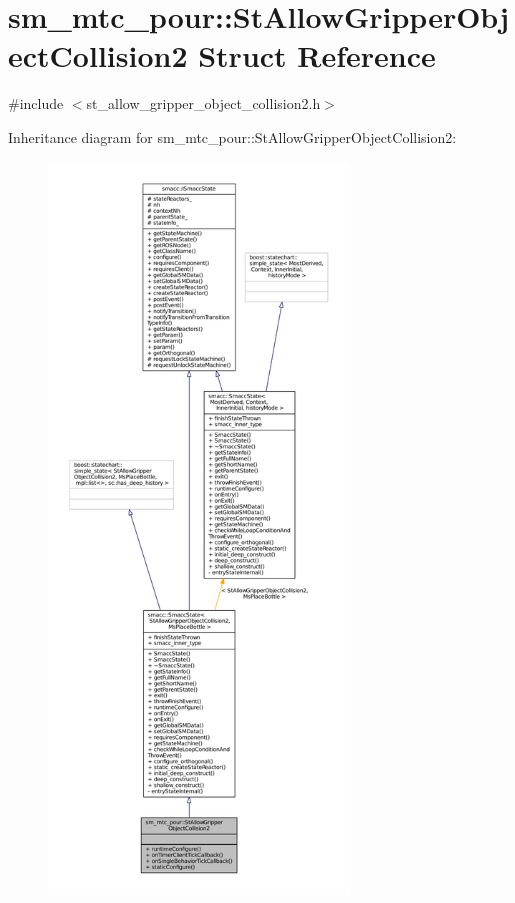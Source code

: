 \hypertarget{structsm__mtc__pour_1_1StAllowGripperObjectCollision2}{}\section{sm\+\_\+mtc\+\_\+pour\+:\+:St\+Allow\+Gripper\+Object\+Collision2 Struct Reference}
\label{structsm__mtc__pour_1_1StAllowGripperObjectCollision2}


{\ttfamily \#include $<$st\+\_\+allow\+\_\+gripper\+\_\+object\+\_\+collision2.\+h$>$}



Inheritance diagram for sm\+\_\+mtc\+\_\+pour\+:\+:St\+Allow\+Gripper\+Object\+Collision2\+:
\nopagebreak
\begin{figure}[H]
\begin{center}
\leavevmode
\includegraphics[height=550pt]{structsm__mtc__pour_1_1StAllowGripperObjectCollision2__inherit__graph}
\end{center}
\end{figure}


